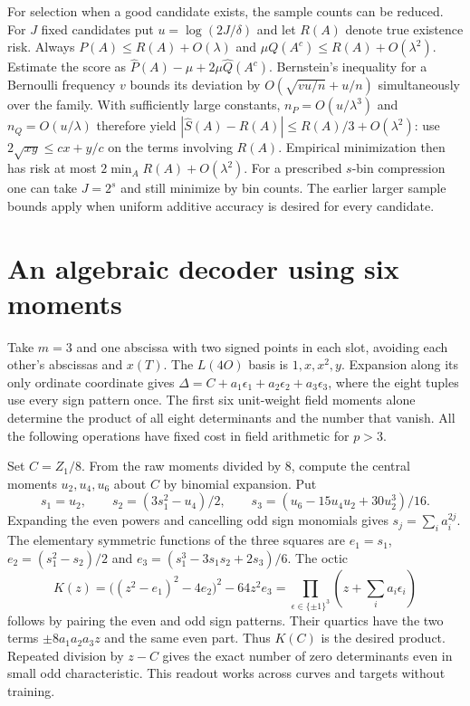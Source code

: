 \documentclass[11pt]{article}
\begin{document}
For selection when a good candidate exists, the sample counts can be
reduced. For $J$ fixed candidates put $u=\log(2J/\delta)$ and let
$R(A)$ denote true existence risk. Always $P(A)\le R(A)+O(\lambda)$
and $\mu Q(A^c)\le R(A)+O(\lambda^2)$. Estimate the score as
$\widehat P(A)-\mu+2\mu\widehat Q(A^c)$. Bernstein's inequality for
a Bernoulli frequency $v$ bounds its deviation by
$O(\sqrt{vu/n}+u/n)$ simultaneously over the family. With sufficiently
large constants, $n_P=O(u/\lambda^3)$ and $n_Q=O(u/\lambda)$ therefore
yield $|\widehat S(A)-R(A)|\le R(A)/3+O(\lambda^2)$: use
$2\sqrt{xy}\le c x+y/c$ on the terms involving $R(A)$.
Empirical minimization then has risk at most $2\min_A R(A)+O(\lambda^2)$.
For a prescribed $s$-bin compression one can take $J=2^s$ and still
minimize by bin counts. The earlier larger sample bounds apply when
uniform additive accuracy is desired for every candidate.

\section{An algebraic decoder using six moments}

Take $m=3$ and one abscissa with two signed points in each slot, avoiding
each other's abscissas and $x(T)$. The $L(4O)$ basis is $1,x,x^2,y$.
Expansion along its only ordinate coordinate gives
$\Delta=C+a_1\epsilon_1+a_2\epsilon_2+a_3\epsilon_3$, where the
eight tuples use every sign pattern once. The first six unit-weight
field moments alone determine the product of all eight determinants
and the number that vanish. All the following operations have fixed
cost in field arithmetic for $p>3$.

Set $C=Z_1/8$. From the raw moments divided by $8$, compute the central
moments $u_2,u_4,u_6$ about $C$ by binomial expansion. Put
\[
 s_1=u_2,\qquad s_2=(3s_1^2-u_4)/2,\qquad
 s_3=(u_6-15u_4u_2+30u_2^3)/16 .
\]
Expanding the even powers and cancelling odd sign monomials gives
$s_j=\sum_i a_i^{2j}$. The elementary symmetric functions of the three
squares are $e_1=s_1$, $e_2=(s_1^2-s_2)/2$ and
$e_3=(s_1^3-3s_1s_2+2s_3)/6$. The octic
\[
 K(z)=\big((z^2-e_1)^2-4e_2\big)^2-64z^2e_3
      =\prod_{\epsilon\in\{\pm1\}^3}\left(z+\sum_i a_i\epsilon_i\right)
\]
follows by pairing the even and odd sign patterns. Their quartics have
the two terms $\pm8a_1a_2a_3 z$ and the same even part.
Thus $K(C)$ is the desired product. Repeated division by $z-C$ gives
the exact number of zero determinants even in small odd characteristic.
This readout works across curves and targets without training.
\end{document}
